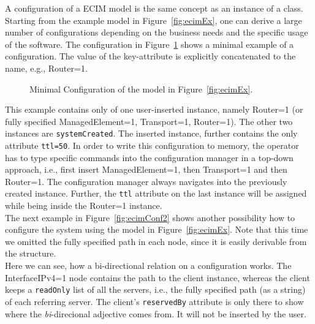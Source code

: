 A configuration of a ECIM model is the same concept as an instance of a class. Starting from the example model in Figure~\ref{fig:ecimEx}, one can derive a large number of configurations depending on the business needs and the specific usage of the software. The configuration in Figure~\ref{fig:ecimConf1} shows a minimal example of a configuration. The value of the key-attribute is explicitly concatenated to the name, e.g., \textsf{Router=1}.

\begin{figure}[htb]
\centering
{}
\caption[Minimal Configuration example]{Minimal Configuration of the model in Figure~\ref{fig:ecimEx}.}
\label{fig:ecimConf1}
\end{figure}

This example contains only of one user-inserted instance, namely \textsf{Router=1} (or fully specified \textsf{ManagedElement=1, Transport=1, Router=1}). The other two instances are \verb|systemCreated|. The inserted instance, further contains the only attribute \verb|ttl=50|. In order to write this configuration to memory, the operator has to type specific commands into the configuration manager in a top-down approach, i.e., first insert \textsf{ManagedElement=1}, then \textsf{Transport=1} and then \textsf{Router=1}. The configuration manager always navigates into the previously created instance. Further, the \verb|ttl| attribute on the last instance will be assigned while being inside the \textsf{Router=1} instance.\\

The next example in Figure~\ref{fig:ecimConf2} shows another possibility how to configure the system using the model in Figure~\ref{fig:ecimEx}. Note that this time we omitted the fully specified path in each node, since it is easily derivable from the structure. \\

Here we can see, how a bi-directional relation on a configuration works. The \textsf{InterfaceIPv4=1} node contains the path to the client instance, whereas the client keeps a \verb|readOnly| list of all the servers, i.e., the fully specified path (as a string) of each referring server. The client's \verb|reservedBy| attribute is only there to show where the \emph{bi}-direcional adjective comes from. It will not be inserted by the user. \\

